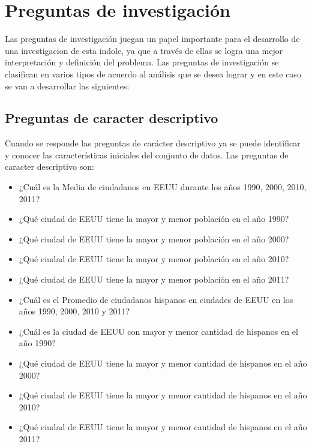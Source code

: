 \section{Preguntas de investigación}

Las preguntas de investigación juegan un papel importante para el desarrollo de una investigacion de esta indole, ya que a través de ellas se logra una mejor interpretación  y definición del problema.  Las preguntas de investigación se clasifican en varios tipos de acuerdo al análisis que se desea lograr y en este caso se van a desarrollar las siguientes:

 \subsection{Preguntas de caracter descriptivo}
 Cuando se responde las preguntas de carácter descriptivo ya se puede identificar y conocer las características iniciales del conjunto de datos. Las preguntas de caracter descriptivo son:
 
  \begin{itemize}
  \item ¿Cuál es la Media de ciudadanos en EEUU durante los años  1990, 2000, 2010, 2011?
  \item ¿Qué ciudad de EEUU tiene la mayor y menor población en el año 1990?
  \item ¿Qué ciudad de EEUU tiene la mayor y menor población en el año 2000?
  \item ¿Qué ciudad de EEUU tiene la mayor y menor población en el año 2010?
  \item ¿Qué ciudad de EEUU tiene la mayor y menor población en el año 2011? 
  \item ¿Cuál es el Promedio de ciudadanos hispanos en ciudades de EEUU en los años 1990, 2000, 2010 y 2011?
  \item ¿Cuál es la ciudad de EEUU con mayor y menor cantidad de hispanos en el año 1990?
  \item ¿Qué ciudad de EEUU tiene la mayor y menor cantidad de hispanos en el año 2000?
  \item ¿Qué ciudad de EEUU tiene la mayor y menor cantidad de hispanos en el año 2010?
  \item ¿Qué ciudad de EEUU tiene la mayor y menor cantidad de hispanos en el año 2011?
  \end{itemize}
  
